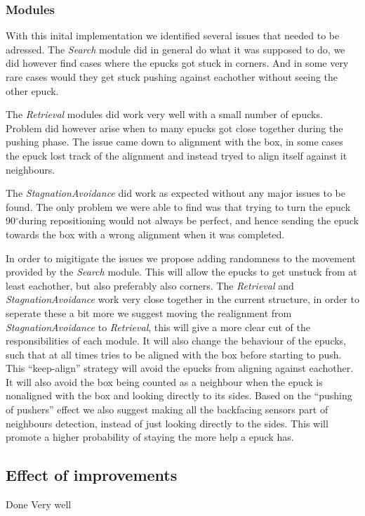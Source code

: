 \documentclass[12pt]{article}
\newcommand{\shiftline}[0]{\hfill\newline\noindent}
\newcommand{\degree}[0]{\ensuremath{^\circ}}
\begin{document}
		\subsubsection{Modules}
			With this inital implementation we identified several issues that needed to be adressed. 
			The \textit{Search} module did in general do what it was supposed to do, we did however find cases where the epucks got stuck in corners. 
			And in some very rare cases would they get stuck pushing against eachother without seeing the other epuck.
		
			\shiftline The \textit{Retrieval} modules did work very well with a small number of epucks. Problem did however arise when to many epucks got close together during
			the pushing phase. The issue came down to alignment with the box, in some cases the epuck lost track of the alignment and instead tryed to align itself against it neighbours. 
			
			\shiftline The \textit{StagnationAvoidance} did work as expected without any major issues to be found. The only problem we were able to find was that trying to turn the
			epuck 90\degree during repositioning would not always be perfect, and hence sending the epuck towards the box with a wrong alignment when it was completed. 
			
			\shiftline In order to migitigate the issues we propose adding randomness to the movement provided by the \textit{Search} module. This will allow the epucks to get 
			unstuck from at least eachother, but also preferably also corners. The \textit{Retrieval} and \textit{StagnationAvoidance} work very close together in the current
			structure, in order to seperate these a bit more we suggest moving the realignment from \textit{StagnationAvoidance} to \textit{Retrieval}, this will give a more 
			clear cut of the responsibilities of each module. It will also change the behaviour of the epucks, such that at all times tries to be aligned with the box
			before starting to push. This "`keep-align"' strategy will avoid the epucks from aligning against eachother. It will also avoid the box being counted as a 
			neighbour when the epuck is nonaligned with the box and looking directly to its sides.
			Based on the "`pushing of pushers"' effect we also suggest making all the backfacing sensors part of neighbours detection, instead of just looking directly
			to the sides. This will promote a higher probability of staying the more help a epuck has.
		
	\subsection{Effect of improvements}
		Done
		Very well

\end{document}
